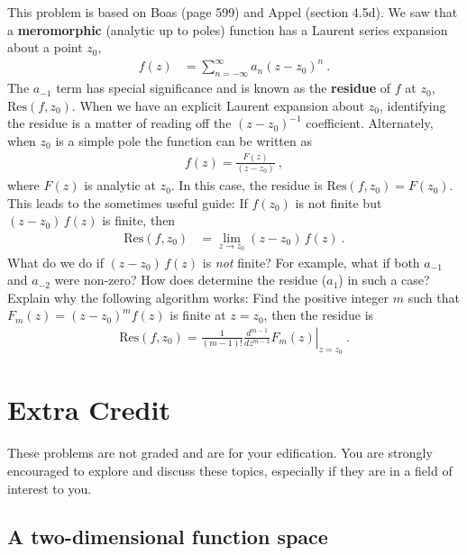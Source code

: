 \documentclass[12pt]{article}
\numberwithin{equation}{subsection}    %
\begin{document}
This problem is based on Boas (page 599) and Appel (section 4.5d).
%
We saw that a \textbf{meromorphic} (analytic up to poles) function has a Laurent series expansion about a point $z_0$,
\begin{align}
f(z) &= \sum_{n=-\infty}^{\infty} a_n (z-z_0)^n
	\ .
\end{align}
The $a_{-1}$ term has special significance and is known as the \textbf{residue} of $f$ at $z_0$, $\text{Res}(f,z_0)$. When we have an explicit Laurent expansion about $z_0$, identifying the residue is a matter of reading off the $(z-z_0)^{-1}$ coefficient. Alternately, when $z_0$ is a simple pole the function can be written as
\begin{align}
	f(z) = \frac{F(z)}{(z-z_0)} \ ,
\end{align}
where $F(z)$ is analytic at $z_0$. In this case, the residue is $\text{Res}(f,z_0) = F(z_0)$. This leads to the sometimes useful guide: If $f(z_0)$ is not finite but $(z-z_0)\, f(z)$ is finite, then
	\begin{align}
		\text{Res}(f,z_0) &=  \lim_{z\to z_0} (z-z_0)\, f(z) \ .
	\end{align}
What do we do if $(z-z_0)\, f(z)$ is \emph{not} finite? For example, what if both $a_{-1}$ and $a_{-2}$ were non-zero? How does determine the residue ($a_1$) in such a case? Explain why the following algorithm works: Find the positive integer $m$ such that $F_m(z)=(z-z_0)^m f(z)$ is finite at $z=z_0$, then the residue is
\begin{align}
	\text{Res}(f,z_0) = \left.\frac{1}{(m-1)!} \frac{d^{m-1}}{dz^{m-1}} F_m(z)\right|_{z=z_0} \ .
\end{align}











\section{Extra Credit}

These problems are not graded and are for your edification. You are strongly encouraged to explore and discuss these topics, especially if they are in a field of interest to you.



\subsection{A two-dimensional function space} 
\end{document}
